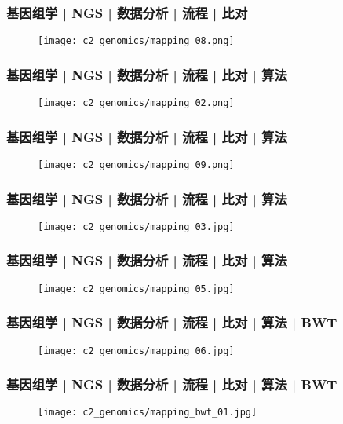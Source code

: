 \begin{frame}
  \frametitle{基因组学 | NGS | 数据分析 | 流程 | 比对}
  \begin{figure}
    \centering
    \texttt{[image: c2\_genomics/mapping\_08.png]}
  \end{figure}
\end{frame}

\begin{frame}
  \frametitle{基因组学 | NGS | 数据分析 | 流程 | 比对 | 算法}
  \begin{figure}
    \centering
    \texttt{[image: c2\_genomics/mapping\_02.png]}
  \end{figure}
\end{frame}

\begin{frame}
  \frametitle{基因组学 | NGS | 数据分析 | 流程 | 比对 | 算法}
  \begin{figure}
    \centering
    \texttt{[image: c2\_genomics/mapping\_09.png]}
  \end{figure}
\end{frame}

\begin{frame}
  \frametitle{基因组学 | NGS | 数据分析 | 流程 | 比对 | 算法}
  \begin{figure}
    \centering
    \texttt{[image: c2\_genomics/mapping\_03.jpg]}
  \end{figure}
\end{frame}

\begin{frame}
  \frametitle{基因组学 | NGS | 数据分析 | 流程 | 比对 | 算法}
  \begin{figure}
    \centering
    \texttt{[image: c2\_genomics/mapping\_05.jpg]}
  \end{figure}
\end{frame}

\begin{frame}
  \frametitle{基因组学 | NGS | 数据分析 | 流程 | 比对 | 算法 | BWT}
  \begin{figure}
    \centering
    \texttt{[image: c2\_genomics/mapping\_06.jpg]}
  \end{figure}
\end{frame}

\begin{frame}
  \frametitle{基因组学 | NGS | 数据分析 | 流程 | 比对 | 算法 | BWT}
  \begin{figure}
    \centering
    \texttt{[image: c2\_genomics/mapping\_bwt\_01.jpg]}
  \end{figure}
\end{frame}

